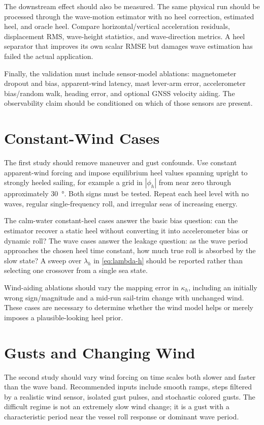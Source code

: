 \documentclass[conference]{IEEEtran}
\newcommand{\abs}[1]{\left|#1\right|}
\begin{document}
The downstream effect should also be measured. The same physical run should be processed
through the wave-motion estimator with no heel correction, estimated heel, and oracle
heel. Compare horizontal/vertical acceleration residuals, displacement RMS, wave-height
statistics, and wave-direction metrics. A heel separator that improves its own scalar
RMSE but damages wave estimation has failed the actual application.

Finally, the validation must include sensor-model ablations: magnetometer dropout and
bias, apparent-wind latency, mast lever-arm error, accelerometer bias/random walk, heading
error, and optional GNSS velocity aiding. The observability claim should be conditioned on
which of those sensors are present.

\section{Constant-Wind Cases}
\label{sec:constant-wind}

The first study should remove maneuver and gust confounds. Use constant apparent-wind
forcing and impose equilibrium heel values spanning upright to strongly heeled sailing,
for example a grid in $\abs{\phi_h}$ from near zero through approximately
\SI{30}{\degree}. Both signs must be tested. Repeat each heel level with no waves, regular
single-frequency roll, and irregular seas of increasing energy.

The calm-water constant-heel cases answer the basic bias question: can the estimator
recover a static heel without converting it into accelerometer bias or dynamic roll? The
wave cases answer the leakage question: as the wave period approaches the chosen heel
time constant, how much true roll is absorbed by the slow state? A sweep over
$\lambda_h$ in \eqref{eq:lambda-h} should be reported rather than selecting one crossover
from a single sea state.

Wind-aiding ablations should vary the mapping error in $\kappa_h$, including an initially
wrong sign/magnitude and a mid-run sail-trim change with unchanged wind. These cases are
necessary to determine whether the wind model helps or merely imposes a plausible-looking
heel prior.

\section{Gusts and Changing Wind}
\label{sec:gusts}

The second study should vary wind forcing on time scales both slower and faster than the
wave band. Recommended inputs include smooth ramps, steps filtered by a realistic wind
sensor, isolated gust pulses, and stochastic colored gusts. The difficult regime is not
an extremely slow wind change; it is a gust with a characteristic period near the vessel
roll response or dominant wave period.
\end{document}
